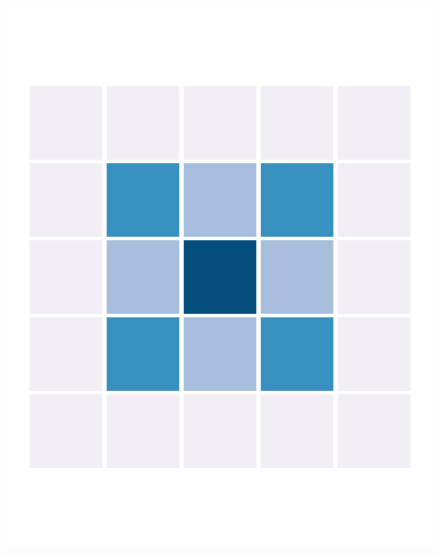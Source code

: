 \begin{figure}
\begin{minipage}[b]{.22\linewidth}
       \includegraphics[width=\linewidth,trim={0.7cm 2.2cm 0.7cm 2.2cm},clip]{body/figures/63-nb_d.pdf}
    \end{minipage}
    \hfill
    \begin{minipage}[b]{.22\linewidth}

\end{minipage}
\end{figure}
